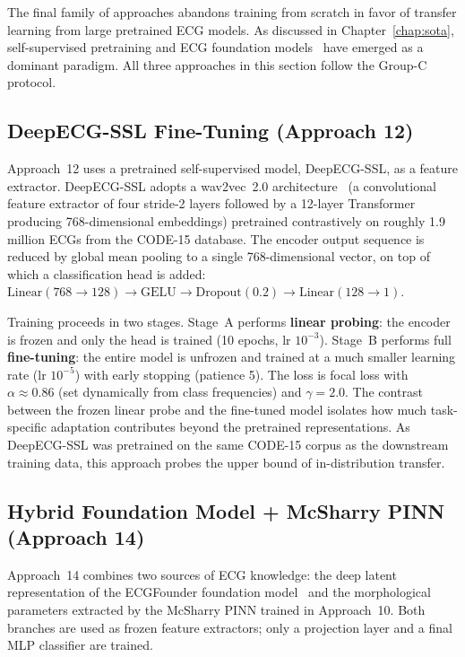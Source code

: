 The final family of approaches abandons training from scratch in favor of transfer learning from large pretrained ECG models. As discussed in Chapter~\ref{chap:sota}, self-supervised pretraining and ECG foundation models~\cite{mckeen2024ecgfm,li2024ecgfounder,song2024foundation} have emerged as a dominant paradigm. All three approaches in this section follow the Group-C protocol.

\subsection{DeepECG-SSL Fine-Tuning (Approach 12)}
\label{sec:deepecg_ssl}

Approach~12 uses a pretrained self-supervised model, DeepECG-SSL, as a feature extractor. DeepECG-SSL adopts a wav2vec~2.0 architecture~\cite{vaswani2017attention} (a convolutional feature extractor of four stride-2 layers followed by a 12-layer Transformer producing 768-dimensional embeddings) pretrained contrastively on roughly 1.9 million ECGs from the CODE-15 database. The encoder output sequence is reduced by global mean pooling to a single 768-dimensional vector, on top of which a classification head is added: $\text{Linear}(768 \to 128) \to \text{GELU} \to \text{Dropout}(0.2) \to \text{Linear}(128 \to 1)$.

Training proceeds in two stages. Stage~A performs \textbf{linear probing}: the encoder is frozen and only the head is trained (10 epochs, lr $10^{-3}$). Stage~B performs full \textbf{fine-tuning}: the entire model is unfrozen and trained at a much smaller learning rate (lr $10^{-5}$) with early stopping (patience 5). The loss is focal loss with $\alpha \approx 0.86$ (set dynamically from class frequencies) and $\gamma = 2.0$. The contrast between the frozen linear probe and the fine-tuned model isolates how much task-specific adaptation contributes beyond the pretrained representations. As DeepECG-SSL was pretrained on the same CODE-15 corpus as the downstream training data, this approach probes the upper bound of in-distribution transfer.

\subsection{Hybrid Foundation Model + McSharry PINN (Approach 14)}
\label{sec:hybrid}

Approach~14 combines two sources of ECG knowledge: the deep latent representation of the ECGFounder foundation model~\cite{li2024ecgfounder} and the morphological parameters extracted by the McSharry PINN trained in Approach~10. Both branches are used as frozen feature extractors; only a projection layer and a final MLP classifier are trained.

